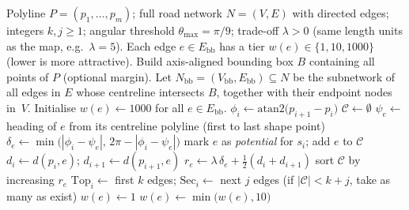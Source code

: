 
\begin{algorithm}[htbp]
\caption{Edge-weight assignment from a GPS polyline (scoring pass)}
\label{alg:route-edge-weights}
\begin{algorithmic}[1]
\Require Polyline $P=(p_1,\ldots,p_m)$; full road network $N=(V,E)$ with directed edges;
         integers $k,j \ge 1$; angular threshold $\theta_{\max}=\pi/9$; trade-off $\lambda>0$ (same length units as the map, e.g.\ $\lambda=5$).
\Ensure Each edge $e\in E_{\mathrm{bb}}$ has a tier $w(e)\in\{1,10,1000\}$ (lower is more attractive).
\State Build axis-aligned bounding box $B$ containing all points of $P$ (optional margin).
\State Let $N_{\mathrm{bb}}=(V_{\mathrm{bb}},E_{\mathrm{bb}})\subseteq N$ be the subnetwork of all edges in $E$ whose centreline intersects $B$, together with their endpoint nodes in~$V$.
\State Initialise $w(e)\gets 1000$ for all $e\in E_{\mathrm{bb}}$.
    \State $\phi_i \gets \mathrm{atan2}\bigl(p_{i+1}-p_i\bigr)$ 
    \State $\mathcal{C}\gets\emptyset$ 
        \State $\psi_e \gets$ heading of $e$ from its centreline polyline (first to last shape point)
        \State $\delta_e \gets \min\bigl(|\phi_i-\psi_e|,\,2\pi-|\phi_i-\psi_e|\bigr)$
            \State mark $e$ as \emph{potential} for $s_i$; add $e$ to $\mathcal{C}$
            \State $d_i \gets d(p_i,e)$; $d_{i+1} \gets d(p_{i+1},e)$
            \State $r_e \gets \lambda\,\delta_e + \tfrac{1}{2}(d_i + d_{i+1})$
        \EndIf
    \EndFor
    \State sort $\mathcal{C}$ by increasing $r_e$
    \State $\mathrm{Top}_i \gets$ first $k$ edges; $\mathrm{Sec}_i \gets$ next $j$ edges (if $|\mathcal{C}|<k{+}j$, take as many as exist)
        \State $w(e)\gets 1$
    \EndFor
        \State $w(e)\gets \min\bigl(w(e),10\bigr)$
    \EndFor
\EndFor
{}
\end{algorithmic}
\end{algorithm}

